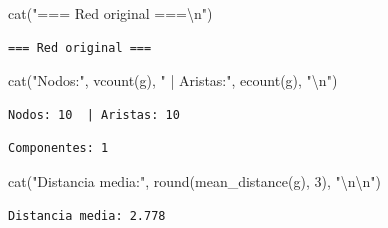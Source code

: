 \documentclass[
  letterpaper,
  DIV=11,
  numbers=noendperiod]{scrreprt}
\newenvironment{Shaded}{\begin{snugshade}}{\end{snugshade}}
\newcommand{\DecValTok}[1]{\textcolor[rgb]{0.68,0.00,0.00}{#1}}
\newcommand{\FunctionTok}[1]{\textcolor[rgb]{0.28,0.35,0.67}{#1}}
\newcommand{\NormalTok}[1]{\textcolor[rgb]{0.00,0.23,0.31}{#1}}
\newcommand{\SpecialCharTok}[1]{\textcolor[rgb]{0.37,0.37,0.37}{#1}}
\newcommand{\StringTok}[1]{\textcolor[rgb]{0.13,0.47,0.30}{#1}}
\begin{document}
\begin{Shaded}
\begin{Highlighting}[]
\FunctionTok{cat}\NormalTok{(}\StringTok{"=== Red original ===}\SpecialCharTok{\textbackslash{}n}\StringTok{"}\NormalTok{)}
\end{Highlighting}
\end{Shaded}

\begin{verbatim}
=== Red original ===
\end{verbatim}

\begin{Shaded}
\begin{Highlighting}[]
\FunctionTok{cat}\NormalTok{(}\StringTok{"Nodos:"}\NormalTok{, }\FunctionTok{vcount}\NormalTok{(g), }\StringTok{" | Aristas:"}\NormalTok{, }\FunctionTok{ecount}\NormalTok{(g), }\StringTok{"}\SpecialCharTok{\textbackslash{}n}\StringTok{"}\NormalTok{)}
\end{Highlighting}
\end{Shaded}

\begin{verbatim}
Nodos: 10  | Aristas: 10 
\end{verbatim}

\begin{Shaded}
\end{Shaded}

\begin{verbatim}
Componentes: 1 
\end{verbatim}

\begin{Shaded}
\begin{Highlighting}[]
\FunctionTok{cat}\NormalTok{(}\StringTok{"Distancia media:"}\NormalTok{, }\FunctionTok{round}\NormalTok{(}\FunctionTok{mean\_distance}\NormalTok{(g), }\DecValTok{3}\NormalTok{), }\StringTok{"}\SpecialCharTok{\textbackslash{}n\textbackslash{}n}\StringTok{"}\NormalTok{)}
\end{Highlighting}
\end{Shaded}

\begin{verbatim}
Distancia media: 2.778 
\end{verbatim}
\end{document}
